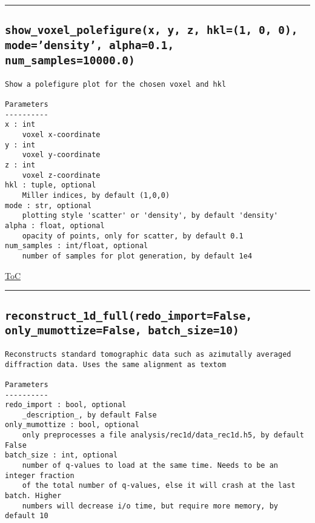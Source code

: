 \documentclass{article}
\begin{document}


\vspace{5mm}

\hrule

\subsection*{\texttt{show\_voxel\_polefigure(x, y, z, hkl=(1, 0, 0), mode='density', alpha=0.1, num\_samples=10000.0)}}

\begin{lstlisting}[language=docstring]
Show a polefigure plot for the chosen voxel and hkl

Parameters
----------
x : int
    voxel x-coordinate
y : int
    voxel y-coordinate
z : int
    voxel z-coordinate
hkl : tuple, optional
    Miller indices, by default (1,0,0)
mode : str, optional
    plotting style 'scatter' or 'density', by default 'density'
alpha : float, optional
    opacity of points, only for scatter, by default 0.1
num_samples : int/float, optional
    number of samples for plot generation, by default 1e4
\end{lstlisting}

\begin{flushright}

\hyperref[toc]{ToC}

\end{flushright}



\vspace{5mm}

\hrule

\subsection*{\texttt{reconstruct\_1d\_full(redo\_import=False, only\_mumottize=False, batch\_size=10)}}

\begin{lstlisting}[language=docstring]
Reconstructs standard tomographic data such as azimutally averaged
diffraction data. Uses the same alignment as textom

Parameters
----------
redo_import : bool, optional
    _description_, by default False
only_mumottize : bool, optional
    only preprocesses a file analysis/rec1d/data_rec1d.h5, by default False
batch_size : int, optional
    number of q-values to load at the same time. Needs to be an integer fraction
    of the total number of q-values, else it will crash at the last batch. Higher
    numbers will decrease i/o time, but require more memory, by default 10
\end{lstlisting}
\end{document}
